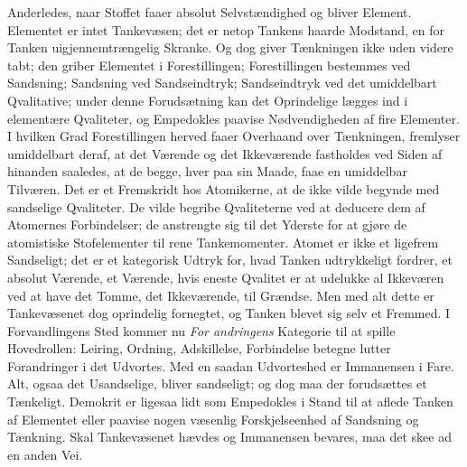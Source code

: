 \documentclass[12pt,a4paper]{book}
\begin{document}
Anderledes, naar Stoffet faaer absolut Selvstændighed og bliver Element.
Elementet er intet Tankevæsen; det er netop Tankens haarde Modstand, en for
Tanken uigjennemtrængelig Skranke. Og dog giver Tænkningen ikke uden videre
tabt; den griber Elementet i Forestillingen; Forestillingen bestemmes ved
Sandsning; Sandsning ved Sandseindtryk; Sandseindtryk ved det umiddelbart
Qvalitative; under denne Forudsætning kan det Oprindelige lægges ind i
elementære Qvaliteter, og Empedokles paavise Nødvendigheden af fire Elementer.
I hvilken Grad Forestillingen herved faaer Overhaand over Tænkningen,
fremlyser umiddelbart deraf, at det Værende og det Ikkeværende fastholdes ved
Siden af hinanden saaledes, at de begge, hver paa sin Maade, faae en
umiddelbar Tilværen. Det er et Fremskridt hos Atomikerne, at de ikke vilde
begynde med sandselige Qvaliteter. De vilde begribe Qvaliteterne ved at
deducere dem af Atomernes Forbindelser; de anstrengte sig til det Yderste for
at gjøre de atomistiske Stofelementer til rene Tankemomenter. Atomet er ikke
et ligefrem Sandseligt; det er et kategorisk Udtryk for, hvad Tanken
udtrykkeligt fordrer, et absolut Værende, et Værende, hvis eneste Qvalitet er
at udelukke al Ikkeværen ved at have det Tomme, det Ikkeværende, til Grændse.
Men med alt dette er Tankevæsenet dog oprindelig fornegtet, og Tanken blevet
sig selv et Fremmed. I Forvandlingens Sted kommer nu
\emph{For\-%
andringens} Kategorie til at spille Hovedrollen: Leiring, Ordning,
Adskillelse, Forbindelse betegne lutter Forandringer i det Udvortes. Med en
saadan Udvorteshed er Immanensen i Fare. Alt, ogsaa det Usandselige, bliver
sandseligt; og dog maa der forudsættes et Tænkeligt. Demokrit er ligesaa lidt
som Empedokles i Stand til at aflede Tanken af Elementet eller paavise nogen
væsenlig Forskjelseenhed af Sandsning og Tænkning. Skal Tankevæsenet hævdes
og Immanensen bevares, maa det skee ad en anden Vei.
\end{document}
